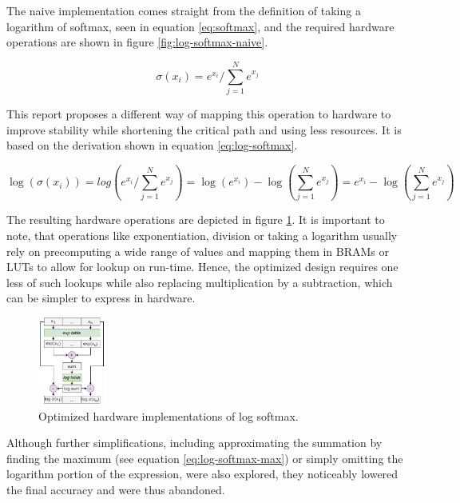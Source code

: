 The naive implementation comes straight from the definition of taking a logarithm of softmax, seen in equation \ref{eq:softmax}, and the required hardware operations are shown in figure \ref{fig:log-softmax-naive}.

\begin{equation} \label{eq:softmax}
    \sigma (x_i) = e^{x_i} / \sum_{j=1}^{N} e^{x_j}
\end{equation}

This report proposes a different way of mapping this operation to hardware to improve stability while shortening the critical path and using less resources. It is based on the derivation shown in equation \ref{eq:log-softmax}.

\begin{equation} \label{eq:log-softmax}
    \log (\sigma (x_i)) = log(e^{x_i} / \sum_{j=1}^{N} e^{x_j}) = \log(e^{x_i}) - \log(\sum_{j=1}^{N} e^{x_j}) = e^{x_i} - \log(\sum_{j=1}^{N} e^{x_j})
\end{equation}

The resulting hardware operations are depicted in figure \ref{fig:log-softmax-opt}. It is important to note, that operations like exponentiation, division or taking a logarithm usually rely on precomputing a wide range of values and mapping them in BRAMs or LUTs to allow for lookup on run-time. Hence, the optimized design requires one less of such lookups while also replacing multiplication by a subtraction, which can be simpler to express in hardware.

\begin{figure}[hpt!]
  \centering
  \includegraphics[trim={0cm 0cm 0cm 0cm}, width=0.2\textwidth, center]{models/log_softmax_opt.pdf}
  \caption{Optimized hardware implementations of log softmax.}
  \label{fig:log-softmax-opt}
\end{figure}

Although further simplifications, including approximating the summation by finding the maximum (see equation \ref{eq:log-softmax-max}) or simply omitting the logarithm portion of the expression, were also explored, they noticeably lowered the final accuracy and were thus abandoned.

